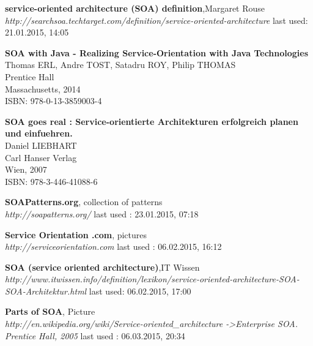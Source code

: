 \documentclass[12pt]{article}
\begin{document}
\listoffigures
\begin{thebibliography}{56}

   \textbf{service-oriented architecture (SOA) definition},Margaret Rouse \\
  \textit{http://searchsoa.techtarget.com/definition/service-oriented-architecture}
  \newline last used: 21.01.2015, 14:05

   \textbf{SOA with Java - Realizing Service-Orientation with Java Technologies}\\
   Thomas ERL, Andre TOST, Satadru ROY, Philip THOMAS \\ 
   Prentice Hall \\
   Massachusetts, 2014 \\
	ISBN: 978-0-13-3859003-4 

   \textbf{SOA goes real : Service-orientierte Architekturen erfolgreich planen und einfuehren.}\\
   Daniel LIEBHART \\ 
   Carl Hanser Verlag \\
   Wien, 2007 \\
	ISBN: 978-3-446-41088-6

  \textbf{SOAPatterns.org}, collection of patterns\\
  \textit{http://soapatterns.org/}
  \newline last used : 23.01.2015, 07:18

  \textbf{Service Orientation .com}, pictures\\
  \textit{http://serviceorientation.com}
  \newline last used : 06.02.2015, 16:12

   \textbf{SOA (service oriented architecture)},IT Wissen \\
  \textit{http://www.itwissen.info/definition/lexikon/service-oriented-architecture-SOA-SOA-Architektur.html}
  \newline last used: 06.02.2015, 17:00

   
   \textbf{Parts of SOA}, Picture \\
  \textit{http://en.wikipedia.org/wiki/Service-oriented\_architecture -\textgreater Enterprise SOA. Prentice Hall, 2005}
  \newline last used : 06.03.2015, 20:34 	


\end{thebibliography}
\end{document}
